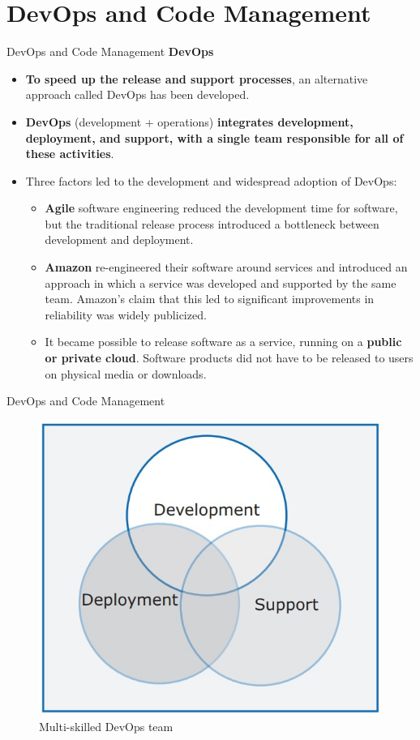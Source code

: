 \documentclass{beamer}
\begin{document}
\section{DevOps and Code Management}


\begin{frame}{DevOps and Code Management}
	\textbf{DevOps}
	\begin{itemize}
		\item \textbf{To speed up the release and support processes}, an alternative approach called DevOps has been developed.
		\item \textbf{DevOps} (development + operations) \textbf{integrates development, deployment, and support, with a single team responsible for all of these activities}.
		\item Three factors led to the development and widespread adoption of DevOps:
		\begin{itemize}
			\item \textbf{Agile} software engineering reduced the development time for software, but the traditional release process introduced a bottleneck between development and deployment.  
			\item \textbf{Amazon} re-engineered their software around services and introduced an approach in which a service was developed and supported by the same team. Amazon’s claim that this led to significant improvements in reliability was widely publicized.
			\item It became possible to release software as a service, running on a\textbf{ public or private cloud}. Software products did not have to be released to users on physical media or downloads.		
		\end{itemize}
	\end{itemize}
\end{frame}
\begin{frame}{DevOps and Code Management}
	\begin{figure}
	\includegraphics[scale=.45]{img/m3_35}
	\caption{Multi-skilled DevOps team}
\end{figure}
\end{frame}
\end{document}

